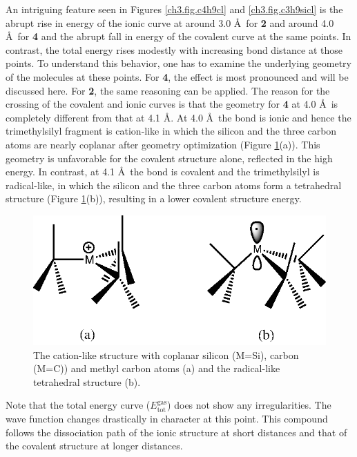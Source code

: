 An intriguing feature seen in Figures \ref{ch3.fig.c4h9cl} and \ref{ch3.fig.c3h9sicl} is the abrupt rise in energy of the ionic curve at around 3.0 \AA\ for \textbf{2} and around 4.0 \AA\ for \textbf{4} and the abrupt fall in energy of the covalent curve at the same points. In contrast, the total energy rises modestly with increasing bond distance at those points. To understand this behavior, one has to examine the underlying geometry of the molecules at these points. For \textbf{4}, the effect is most pronounced and will be discussed here. For \textbf{2}, the same reasoning can be applied. The reason for the crossing of the covalent and ionic curves is that the geometry for \textbf{4} at 4.0 \AA\ is completely different from that at 4.1 \AA. At 4.0 \AA\ the bond is ionic and hence the trimethylsilyl fragment is cation-like in which the silicon and the three carbon atoms are nearly coplanar after geometry optimization (Figure \ref{ch3.fig.crossing}(a)). This geometry is unfavorable for the covalent structure alone, reflected in the high energy.  In contrast, at 4.1 \AA\  the bond is covalent and the trimethylsilyl is radical-like, in which the silicon and the three carbon atoms form a tetrahedral structure (Figure \ref{ch3.fig.crossing}(b)), resulting in a lower covalent structure energy. 
\begin{figure}[hbtp]
\center
\includegraphics[scale=1.0]{dissociation/figures/crossing.eps}
\caption{The cation-like structure with coplanar silicon (M=Si), carbon (M=C)) and methyl carbon atoms (a) and the radical-like tetrahedral structure (b).}
\label{ch3.fig.crossing}
\end{figure}
Note that the total energy curve ($E_\mathrm{tot}^\mathrm{gas}$) does not show any irregularities.  The wave function changes drastically in character at this point. This compound follows the dissociation path of the ionic structure at short distances and that of the covalent structure at longer distances. 

